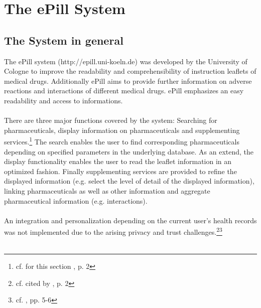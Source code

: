 \section{The ePill System}

\subsection{The System in general}
The ePill system (http://epill.uni-koeln.de) was developed by the University of Cologne to improve the readability and comprehensibility of instruction leaflets of medical drugs. Additionally ePill aims to provide further information on adverse reactions and interactions of different medical drugs. ePill emphasizes an easy readability and access to informations.
\\
\\
There are three major functions covered by the system: Searching for pharmaceuticals, display information on pharmaceuticals and supplementing services.\footnote{cf. for this section \cite{Dehling.2012}, p. 2} The search enables the user to find corresponding pharmaceuticals depending on specified parameters in the underlying database. As an extend, the display functionality enables the user to read the leaflet information in an optimized fashion. Finally supplementing services are provided to refine the displayed information (e.g. select the level of detail of the displayed information), linking pharmaceuticals as well as other information and aggregate pharmaceutical information (e.g. interactions).
\\
\\
An integration and personalization depending on the current user's health records was not implemented due to the arising privacy and trust challenges.\footnote{cf. \cite{Kaletsch.2011} cited by \cite{Dehling.2012}, p. 2}\footnote{cf. \cite{Kaletsch.2011}, pp. 5-6}
\\
\\

